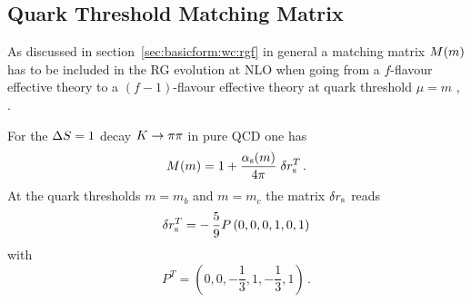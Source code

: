 \subsection{Quark Threshold Matching Matrix}
            \label{sec:HeffdF1:66:Mm}
As discussed in section~\ref{sec:basicform:wc:rgf} in general a 
matching matrix $M(m)$ has to be included in the RG evolution at NLO when
going from a $f$-flavour effective theory to a $(f-1)$-flavour
effective theory at quark threshold $\mu = m$ \cite{burasetal:92a},
\cite{burasetal:92d}.

For the $\Delta S=1$ decay $K \to \pi\pi$ in pure QCD one has \cite{burasetal:92a}
\begin{equation}
M(m) = 1 + \frac{\alpha_{\rm s}(m)}{4\pi} \; \delta r_{\rm s}^T \, .
\label{eq:MmKpp}
\end{equation}
At the quark thresholds $m=m_b$ and $m=m_c$ the matrix $\delta r_{\rm s}$ reads
\begin{equation}
\delta r_{\rm s}^T = -\, \frac{5}{9} P \, (0, 0, 0, 1, 0, 1)
\label{eq:drsmbcKpp}
\end{equation}
with
\begin{equation}
P^T = (0,0,-\frac{1}{3},1,-\frac{1}{3},1) \, .
\label{eq:PdrsKpp}
\end{equation}

